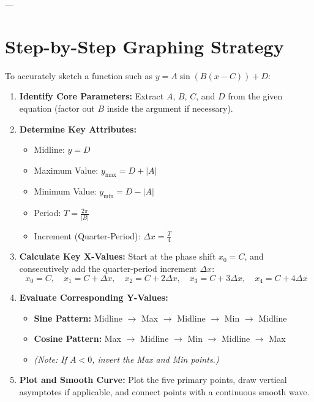 \documentclass[11pt, a4paper]{article}
\begin{document}
---

\section{Step-by-Step Graphing Strategy}

To accurately sketch a function such as $y = A \sin(B(x - C)) + D$:

\begin{enumerate}
    \item \textbf{Identify Core Parameters:}
    Extract $A$, $B$, $C$, and $D$ from the given equation (factor out $B$ inside the argument if necessary).
    
    \item \textbf{Determine Key Attributes:}
    \begin{itemize}
        \item Midline: $y = D$
        \item Maximum Value: $y_{\text{max}} = D + |A|$
        \item Minimum Value: $y_{\text{min}} = D - |A|$
        \item Period: $T = \frac{2\pi}{|B|}$
        \item Increment (Quarter-Period): $\Delta x = \frac{T}{4}$
    \end{itemize}
    
    \item \textbf{Calculate Key X-Values:}
    Start at the phase shift $x_0 = C$, and consecutively add the quarter-period increment $\Delta x$:
    \begin{equation*}
    x_0 = C, \quad x_1 = C + \Delta x, \quad x_2 = C + 2\Delta x, \quad x_3 = C + 3\Delta x, \quad x_4 = C + 4\Delta x
    \end{equation*}

    \item \textbf{Evaluate Corresponding Y-Values:}
    \begin{itemize}
        \item \textbf{Sine Pattern:} Midline $\rightarrow$ Max $\rightarrow$ Midline $\rightarrow$ Min $\rightarrow$ Midline
        \item \textbf{Cosine Pattern:} Max $\rightarrow$ Midline $\rightarrow$ Min $\rightarrow$ Midline $\rightarrow$ Max
        \item \textit{(Note: If $A < 0$, invert the Max and Min points.)}
    \end{itemize}

    \item \textbf{Plot and Smooth Curve:}
    Plot the five primary points, draw vertical asymptotes if applicable, and connect points with a continuous smooth wave.
\end{enumerate}
\end{document}
